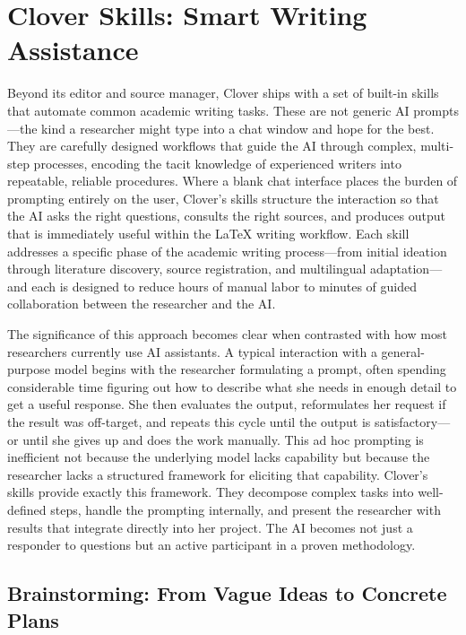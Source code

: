 \documentclass[a4paper,11pt]{article}
\begin{document}
\newpage

\section{Clover Skills: Smart Writing Assistance}
\label{sec:skills}

Beyond its editor and source manager, Clover ships with a set of built-in skills that automate common academic writing tasks. These are not generic AI prompts---the kind a researcher might type into a chat window and hope for the best. They are carefully designed workflows that guide the AI through complex, multi-step processes, encoding the tacit knowledge of experienced writers into repeatable, reliable procedures. Where a blank chat interface places the burden of prompting entirely on the user, Clover's skills structure the interaction so that the AI asks the right questions, consults the right sources, and produces output that is immediately useful within the \LaTeX{} writing workflow. Each skill addresses a specific phase of the academic writing process---from initial ideation through literature discovery, source registration, and multilingual adaptation---and each is designed to reduce hours of manual labor to minutes of guided collaboration between the researcher and the AI.

The significance of this approach becomes clear when contrasted with how most researchers currently use AI assistants. A typical interaction with a general-purpose model begins with the researcher formulating a prompt, often spending considerable time figuring out how to describe what she needs in enough detail to get a useful response. She then evaluates the output, reformulates her request if the result was off-target, and repeats this cycle until the output is satisfactory---or until she gives up and does the work manually. This ad hoc prompting is inefficient not because the underlying model lacks capability but because the researcher lacks a structured framework for eliciting that capability. Clover's skills provide exactly this framework. They decompose complex tasks into well-defined steps, handle the prompting internally, and present the researcher with results that integrate directly into her project. The AI becomes not just a responder to questions but an active participant in a proven methodology.

\subsection{Brainstorming: From Vague Ideas to Concrete Plans}
\end{document}
